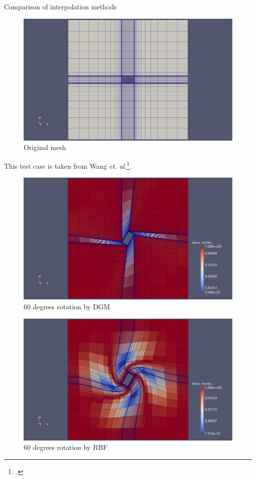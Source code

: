 \documentclass[t,12pt]{beamer}
\begin{document}
\begin{frame}{Comparison of interpolation methods}
 \begin{figure}
 	\centering
 	\includegraphics[scale=0.15]{qin-orig-mesh.pdf}
 	\caption{Original mesh}
 	\label{fig:qin-orig}
 \end{figure}
 This test case is taken from Wang \emph{et. al.}\footcite{mm:dgrbf}.
\end{frame}
\begin{frame}
	 \begin{figure}
	 	\centering
	 	\includegraphics[scale=0.2]{qin-60-dgm-quality.pdf}
	 	\caption{60 degrees rotation by DGM}
	 	\label{fig:qin-60-dgm}
	 \end{figure}
\end{frame}
\begin{frame}
	 \begin{figure}
	 	\centering
	 	\includegraphics[scale=0.2]{qin-60-rbf-quality.pdf}
	 	\caption{60 degrees rotation by RBF}
	 	\label{fig:qin-60-rbf}
	 \end{figure}
\end{frame}
\end{document}
